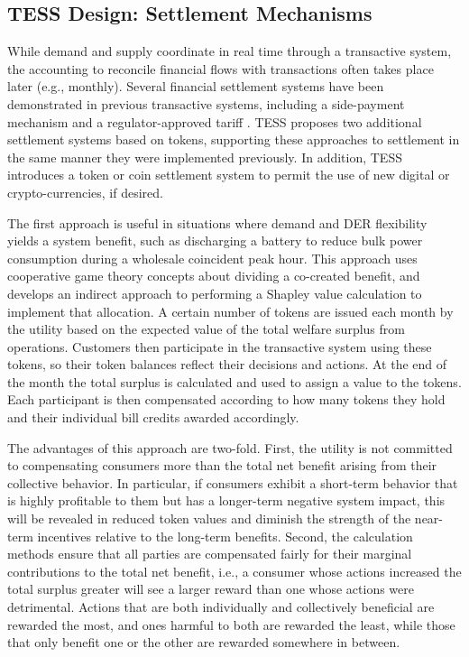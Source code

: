 \subsection{TESS Design: Settlement Mechanisms}\label{sec:settlement}

While demand and supply coordinate in real time through a transactive system, the accounting to reconcile financial flows with transactions often takes place later (e.g., monthly). Several financial settlement systems have been demonstrated in previous transactive systems, including a side-payment mechanism \citep{hammerstrom_2008} and a regulator-approved tariff \citep{Widergren2014}. TESS proposes two additional settlement systems based on tokens, supporting these approaches to settlement in the same manner they were implemented previously. In addition, TESS introduces a token or coin settlement system to permit the use of new digital or crypto-currencies, if desired.

The first approach is useful in situations where demand and DER flexibility yields a system benefit, such as discharging a battery to reduce bulk power consumption during a wholesale coincident peak hour. This approach uses cooperative game theory concepts about dividing a co-created benefit, and develops an indirect approach to performing a Shapley value calculation to implement that allocation. A certain number of tokens are issued each month by the utility based on the expected value of the total welfare surplus from operations. Customers then participate in the transactive system using these tokens, so their token balances reflect their decisions and actions. At the end of the month the total surplus is calculated and used to assign a value to the tokens. Each participant is then compensated according to how many tokens they hold and their individual bill credits awarded accordingly.

The advantages of this approach are two-fold. First, the utility is not committed to compensating consumers more than the total net benefit arising from their collective behavior. In particular, if consumers exhibit a short-term behavior that is highly profitable to them but has a longer-term negative system impact, this will be revealed in reduced token values and diminish the strength of the near-term incentives relative to the long-term benefits.  Second, the calculation methods ensure that all parties are compensated fairly for their marginal contributions to the total net benefit, i.e., a consumer whose actions increased the total surplus greater will see a larger reward than one whose actions were detrimental. Actions that are both individually and collectively beneficial are rewarded the most, and ones harmful to both are rewarded the least, while those that only benefit one or the other are rewarded somewhere in between.  

